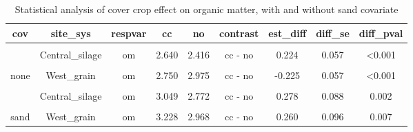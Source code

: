 \documentclass[
]{article}
\begin{document}
\begin{table}[H]

\caption{\label{tab:omstats}Statistical analysis of cover crop effect on organic matter, with and without sand covariate}
\centering
\begin{tabular}[t]{ccccccccc}
\toprule
cov & site\_sys & respvar & cc & no & contrast & est\_diff & diff\_se & diff\_pval\\
\midrule
\cellcolor{gray!6}{none} & \cellcolor{gray!6}{Central\_grain} & \cellcolor{gray!6}{om} & \cellcolor{gray!6}{2.360} & \cellcolor{gray!6}{2.480} & \cellcolor{gray!6}{cc - no} & \cellcolor{gray!6}{-0.120} & \cellcolor{gray!6}{0.051} & \cellcolor{gray!6}{0.02}\\
 & Central\_silage & om & 2.640 & 2.416 & cc - no & 0.224 & 0.057 & <0.001\\

\cellcolor{gray!6}{none} & \cellcolor{gray!6}{East\_grain} & \cellcolor{gray!6}{om} & \cellcolor{gray!6}{3.575} & \cellcolor{gray!6}{3.675} & \cellcolor{gray!6}{cc - no} & \cellcolor{gray!6}{-0.100} & \cellcolor{gray!6}{0.057} & \cellcolor{gray!6}{0.082}\\
\multirow{-4}{*}{\centering\arraybackslash none} & West\_grain & om & 2.750 & 2.975 & cc - no & -0.225 & 0.057 & <0.001\\
\cmidrule{1-9}
\cellcolor{gray!6}{sand} & \cellcolor{gray!6}{Central\_grain} & \cellcolor{gray!6}{om} & \cellcolor{gray!6}{3.034} & \cellcolor{gray!6}{3.066} & \cellcolor{gray!6}{cc - no} & \cellcolor{gray!6}{-0.032} & \cellcolor{gray!6}{0.082} & \cellcolor{gray!6}{0.696}\\
 & Central\_silage & om & 3.049 & 2.772 & cc - no & 0.278 & 0.088 & 0.002\\

\cellcolor{gray!6}{sand} & \cellcolor{gray!6}{East\_grain} & \cellcolor{gray!6}{om} & \cellcolor{gray!6}{2.290} & \cellcolor{gray!6}{2.105} & \cellcolor{gray!6}{cc - no} & \cellcolor{gray!6}{0.185} & \cellcolor{gray!6}{0.093} & \cellcolor{gray!6}{0.048}\\
\multirow{-4}{*}{\centering\arraybackslash sand} & West\_grain & om & 3.228 & 2.968 & cc - no & 0.260 & 0.096 & 0.007\\
\bottomrule
\end{tabular}
\end{table}
\end{document}
